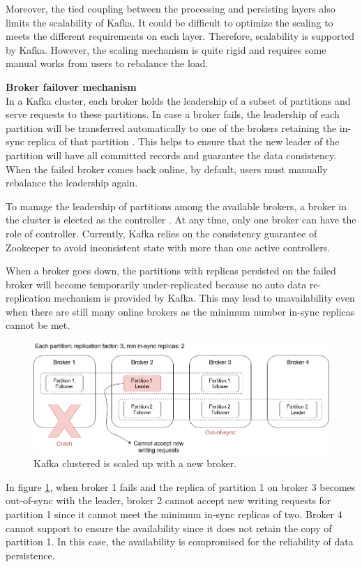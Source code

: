 Moreover, the tied coupling between the processing and persisting layers also limits the scalability of Kafka. It could be difficult to optimize the scaling to meets the different requirements on each layer. Therefore, scalability is supported by Kafka. However, the scaling mechanism is quite rigid and requires some manual works from users to rebalance the load. 

\textbf{Broker failover mechanism}\\
In a Kafka cluster, each broker holds the leadership of a subset of partitions and serve requests to these partitions. In case a broker fails, the leadership of each partition will be transferred automatically to one of the brokers retaining the in-sync replica of that partition \cite{kafkadatareplication}. This helps to ensure that the new leader of the partition will have all committed records and guarantee the data consistency. When the failed broker comes back online, by default, users must manually rebalance the leadership again. 

To manage the leadership of partitions among the available brokers, a broker in the cluster is elected as the controller \cite{kafkaleaderelection}. At any time, only one broker can have the role of controller. Currently, Kafka relies on the consistency guarantee of Zookeeper to avoid inconsistent state with more than one active controllers. 

When a broker goes down, the partitions with replicas persisted on the failed broker will become temporarily under-replicated because no auto data re-replication mechanism is provided by Kafka. This may lead to unavailability even when there are still many online brokers as the minimum number in-sync replicas cannot be met. 

\begin{figure}[h]
	\centering
	\includegraphics[width=\linewidth]{images/broker-failover-kafka.png}
	\caption{Kafka clustered is scaled up with a new broker.}
	\label{fig:brokerfailoverkafka}
\end{figure}
In figure \ref{fig:brokerfailoverkafka}, when broker 1 fails and the replica of partition 1 on broker 3 becomes out-of-sync with the leader, broker 2 cannot accept new writing requests for partition 1 since it cannot meet the minimum in-sync replicas of two. Broker 4 cannot support to ensure the availability since it does not retain the copy of partition 1. In this case, the availability is compromised for the reliability of data persistence.

